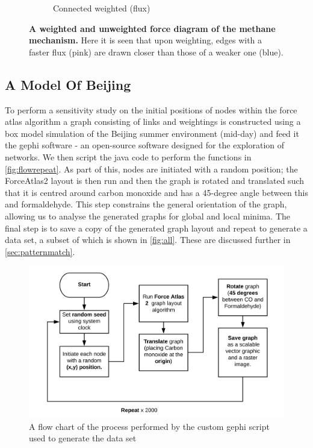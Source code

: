 \begin{figure}[H]
\begin{subfigure}[b]{.4\textwidth}
     \caption{Connected weighted (flux)}
     \end{subfigure}
        \caption{\textbf{A weighted and unweighted force diagram of the methane mechanism.} Here it is seen that upon weighting, edges with a faster flux (pink) are drawn closer than those of a weaker one (blue).}
      \label{fig:resmeth}
\end{figure}


\subsection{A Model Of Beijing}
To perform a sensitivity study on the initial positions of nodes within the force atlas algorithm a graph consisting of links and weightings is constructed using a box model simulation of the Beijing summer environment (mid-day) and feed it the gephi software \citep{gephi} - an open-source software designed for the exploration of networks. We then script the java code to perform the functions in \autoref{fig:flowrepeat}. As part of this, nodes are initiated with a random position; the ForceAtlas2 layout is then run and then the graph is rotated and translated such that it is centred around carbon monoxide and has a 45-degree angle between this and formaldehyde. This step constrains the general orientation of the graph, allowing us to analyse the generated graphs for global and local minima. The final step is to save a copy of the generated graph layout and repeat to generate a data set, a subset of which is shown in  \autoref{fig:all}. These are discussed further in \autoref{sec:patternmatch}.

    \begin{figure}[H]
         \centering
     \includegraphics[width=\textwidth]{figures_c1/flowrepeat.png}
     \caption{ A flow chart of the process performed by the custom gephi script used to generate the data set}
     \label{fig:flowrepeat}
     \end{figure}
 
